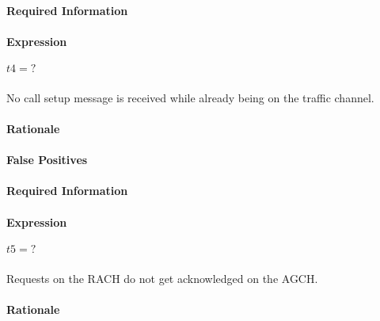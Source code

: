 \documentclass[a4paper,11pt,notitlepage,bigheadings,oneside]{scrartcl}
\begin{document}

\paragraph{Required Information}


\paragraph{Expression}

$t4 = ?$

\subsubsection{}

No call setup message is received while already being on the traffic channel.

\paragraph{Rationale}


\paragraph{False Positives}


\paragraph{Required Information}


\paragraph{Expression}

$t5 = ?$

\subsubsection{}

Requests on the RACH do not get acknowledged on the AGCH.

\paragraph{Rationale}
\end{document}

